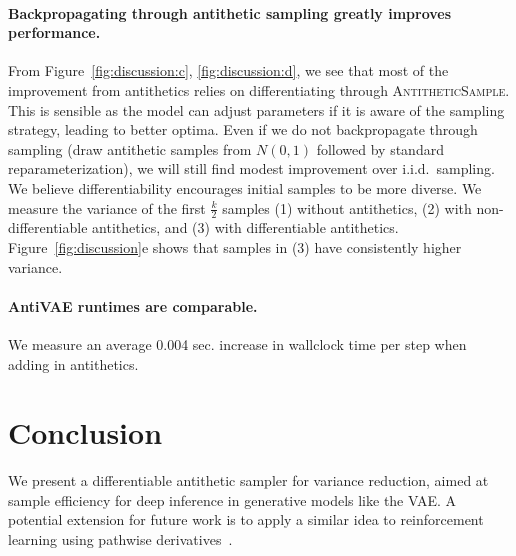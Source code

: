 \paragraph{Backpropagating through antithetic sampling greatly improves performance.} From Figure~\ref{fig:discussion:c}, \ref{fig:discussion:d}, we see that most of the improvement from antithetics relies on differentiating through \textsc{AntitheticSample}. This is sensible as the model can adjust parameters if it is aware of the sampling strategy, leading to better optima. Even if we do not backpropagate through sampling (draw antithetic samples from $N(0, 1)$ followed by standard reparameterization), we will still find modest improvement over i.i.d.~sampling.
We believe differentiability encourages initial samples to be more diverse. We measure the variance of the first $\frac{k}{2}$ samples (1) without antithetics, (2) with non-differentiable antithetics, and (3) with differentiable antithetics. Figure~\ref{fig:discussion}e shows that samples in (3) have consistently higher variance.

\paragraph{AntiVAE runtimes are comparable.} We measure an average 0.004 sec. increase in wallclock time per step when adding in antithetics.

\section{Conclusion}
\label{sec:conclusion}
We present a differentiable antithetic sampler for variance reduction, aimed at sample efficiency for deep inference in generative models like the VAE. A potential extension for future work is to apply a similar idea to reinforcement learning using pathwise derivatives~\cite{levy2018deterministic}.